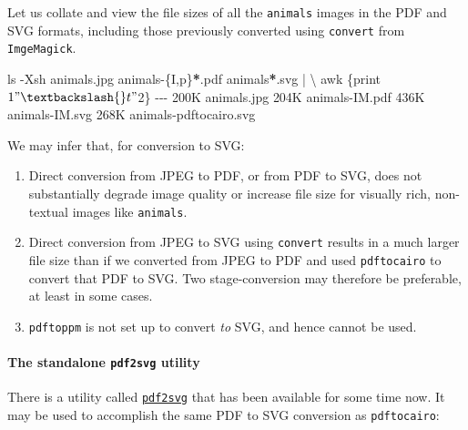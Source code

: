 \documentclass[
  11pt,
  british,
  a4paper,
]{article}
\newenvironment{Shaded}{\begin{snugshade}}{\end{snugshade}}
\newcommand{\AttributeTok}[1]{\textcolor[rgb]{0.80,0.80,0.80}{#1}}
\newcommand{\DataTypeTok}[1]{\textcolor[rgb]{0.87,0.87,0.75}{#1}}
\newcommand{\ExtensionTok}[1]{\textcolor[rgb]{0.80,0.80,0.80}{#1}}
\newcommand{\FunctionTok}[1]{\textcolor[rgb]{0.94,0.94,0.56}{#1}}
\newcommand{\KeywordTok}[1]{\textcolor[rgb]{0.94,0.87,0.69}{#1}}
\newcommand{\NormalTok}[1]{\textcolor[rgb]{0.80,0.80,0.80}{#1}}
\newcommand{\OperatorTok}[1]{\textcolor[rgb]{0.94,0.94,0.82}{#1}}
\newcommand{\PreprocessorTok}[1]{\textcolor[rgb]{1.00,0.81,0.69}{\textbf{#1}}}
\newcommand{\StringTok}[1]{\textcolor[rgb]{0.80,0.58,0.58}{#1}}
\begin{document}
Let us collate and view the file sizes of all the \texttt{animals}
images in the PDF and SVG formats, including those previously converted
using \texttt{convert} from \texttt{ImgeMagick}.

\begin{Shaded}
\begin{Highlighting}[]
\FunctionTok{ls} \AttributeTok{{-}Xsh}\NormalTok{ animals.jpg animals{-}}\DataTypeTok{\{I}\OperatorTok{,}\DataTypeTok{p\}}\PreprocessorTok{*}\NormalTok{.pdf animals}\PreprocessorTok{*}\NormalTok{.svg }\KeywordTok{|} \DataTypeTok{\textbackslash{}}
\FunctionTok{awk} \StringTok{\textquotesingle{}\{print $1 "\textbackslash{}t" $2\}\textquotesingle{}}
\ExtensionTok{{-}{-}{-}}
\ExtensionTok{200K}\NormalTok{    animals.jpg}
\ExtensionTok{204K}\NormalTok{    animals{-}IM.pdf}
\ExtensionTok{436K}\NormalTok{    animals{-}IM.svg}
\ExtensionTok{268K}\NormalTok{    animals{-}pdftocairo.svg}
\end{Highlighting}
\end{Shaded}

We may infer that, for conversion to SVG:

\begin{enumerate}
\item
  Direct conversion from JPEG to PDF, or from PDF to SVG, does not
  substantially degrade image quality or increase file size for visually
  rich, non-textual images like \texttt{animals}.
\item
  Direct conversion from JPEG to SVG using \texttt{convert} results in a
  much larger file size than if we converted from JPEG to PDF and used
  \texttt{pdftocairo} to convert that PDF to SVG. Two stage-conversion
  may therefore be preferable, at least in some cases.
\item
  \texttt{pdftoppm} is not set up to convert \emph{to} SVG, and hence
  cannot be used.
\end{enumerate}

\hypertarget{the-standalone-pdf2svg-utility}{%
\paragraph{\texorpdfstring{The standalone \texttt{pdf2svg}
utility}{The standalone pdf2svg utility}}\label{the-standalone-pdf2svg-utility}}

There is a utility called
\href{https://github.com/dawbarton/pdf2svg}{\texttt{pdf2svg}} that has
been available for some time now. It may be used to accomplish the same
PDF to SVG conversion as \texttt{pdftocairo}:
\end{document}
